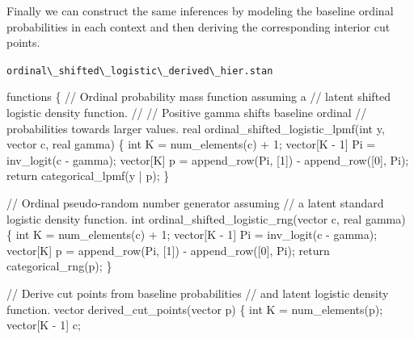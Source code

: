 \documentclass[
  letterpaper,
  DIV=11,
  numbers=noendperiod]{scrartcl}
\newenvironment{Shaded}{\begin{snugshade}}{\end{snugshade}}
\newcommand{\CommentTok}[1]{\textcolor[rgb]{0.37,0.37,0.37}{#1}}
\newcommand{\ControlFlowTok}[1]{\textcolor[rgb]{0.00,0.23,0.31}{#1}}
\newcommand{\DataTypeTok}[1]{\textcolor[rgb]{0.68,0.00,0.00}{#1}}
\newcommand{\DecValTok}[1]{\textcolor[rgb]{0.68,0.00,0.00}{#1}}
\newcommand{\KeywordTok}[1]{\textcolor[rgb]{0.00,0.23,0.31}{#1}}
\newcommand{\NormalTok}[1]{\textcolor[rgb]{0.00,0.23,0.31}{#1}}
\begin{document}
Finally we can construct the same inferences by modeling the baseline
ordinal probabilities in each context and then deriving the
corresponding interior cut points.

\begin{codelisting}

\caption{\texttt{ordinal\textbackslash\_shifted\textbackslash\_logistic\textbackslash\_derived\textbackslash\_hier.stan}}

\begin{Shaded}
\begin{Highlighting}[]
\KeywordTok{functions}\NormalTok{ \{}
  \CommentTok{// Ordinal probability mass function assuming a}
  \CommentTok{// latent shifted logistic density function.}
  \CommentTok{//}
  \CommentTok{// Positive gamma shifts baseline ordinal}
  \CommentTok{// probabilities towards larger values.}
  \DataTypeTok{real}\NormalTok{ ordinal\_shifted\_logistic\_lpmf(}\DataTypeTok{int}\NormalTok{ y, }\DataTypeTok{vector}\NormalTok{ c, }\DataTypeTok{real}\NormalTok{ gamma) \{}
    \DataTypeTok{int}\NormalTok{ K = num\_elements(c) + }\DecValTok{1}\NormalTok{;}
    \DataTypeTok{vector}\NormalTok{[K {-} }\DecValTok{1}\NormalTok{] Pi = inv\_logit(c {-} gamma);}
    \DataTypeTok{vector}\NormalTok{[K] p = append\_row(Pi, [}\DecValTok{1}\NormalTok{]\textquotesingle{}) {-} append\_row([}\DecValTok{0}\NormalTok{]\textquotesingle{}, Pi);}
    \ControlFlowTok{return}\NormalTok{ categorical\_lpmf(y | p);}
\NormalTok{  \}}

  \CommentTok{// Ordinal pseudo{-}random number generator assuming}
  \CommentTok{// a latent standard logistic density function.}
  \DataTypeTok{int}\NormalTok{ ordinal\_shifted\_logistic\_rng(}\DataTypeTok{vector}\NormalTok{ c, }\DataTypeTok{real}\NormalTok{ gamma) \{}
    \DataTypeTok{int}\NormalTok{ K = num\_elements(c) + }\DecValTok{1}\NormalTok{;}
    \DataTypeTok{vector}\NormalTok{[K {-} }\DecValTok{1}\NormalTok{] Pi = inv\_logit(c {-} gamma);}
    \DataTypeTok{vector}\NormalTok{[K] p = append\_row(Pi, [}\DecValTok{1}\NormalTok{]\textquotesingle{}) {-} append\_row([}\DecValTok{0}\NormalTok{]\textquotesingle{}, Pi);}
    \ControlFlowTok{return}\NormalTok{ categorical\_rng(p);}
\NormalTok{  \}}

  \CommentTok{// Derive cut points from baseline probabilities}
  \CommentTok{// and latent logistic density function.}
  \DataTypeTok{vector}\NormalTok{ derived\_cut\_points(}\DataTypeTok{vector}\NormalTok{ p) \{}
    \DataTypeTok{int}\NormalTok{ K = num\_elements(p);}
    \DataTypeTok{vector}\NormalTok{[K {-} }\DecValTok{1}\NormalTok{] c;}


\end{Highlighting}
\end{Shaded}
\end{codelisting}
\end{document}
